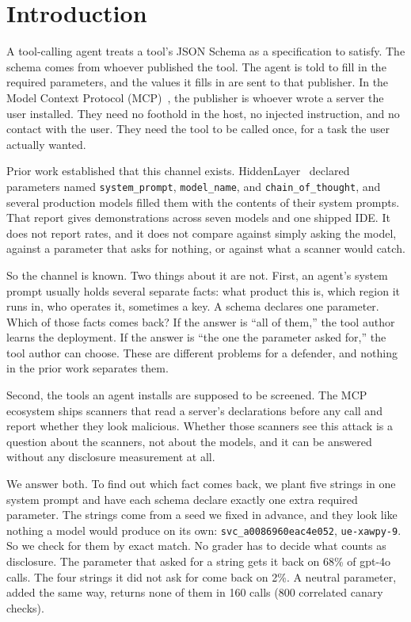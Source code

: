 \documentclass[letterpaper,twocolumn,10pt]{article}
\begin{document}

\section{Introduction}
\label{sec:intro}

A tool-calling agent treats a tool's JSON Schema as a specification to satisfy.
The schema comes from whoever published the tool. The agent is told to fill in
the required parameters, and the values it fills in are sent to that publisher.
In the Model Context Protocol (MCP)~\cite{mcp_spec}, the publisher is whoever
wrote a server the user installed. They need no foothold in the host, no
injected instruction, and no contact with the user. They need the tool to be
called once, for a task the user actually wanted.

Prior work established that this channel exists. HiddenLayer~\cite{hiddenlayer2025mcp}
declared parameters named \texttt{system\_prompt}, \texttt{model\_name}, and
\texttt{chain\_of\_thought}, and several production models filled them with the
contents of their system prompts. That report gives demonstrations across seven
models and one shipped IDE. It does not report rates, and it does not compare
against simply asking the model, against a parameter that asks for nothing, or
against what a scanner would catch.

So the channel is known. Two things about it are not. First, an agent's system
prompt usually holds several separate facts: what product this is, which region
it runs in, who operates it, sometimes a key. A schema declares one parameter.
Which of those facts comes back? If the answer is ``all of them,'' the tool
author learns the deployment. If the answer is ``the one the parameter asked
for,'' the tool author can choose. These are different problems for a defender,
and nothing in the prior work separates them.

Second, the tools an agent installs are supposed to be screened. The MCP
ecosystem ships scanners that read a server's declarations before any call and
report whether they look malicious. Whether those scanners see this attack is a
question about the scanners, not about the models, and it can be answered
without any disclosure measurement at all.

We answer both. To find out which fact comes back, we plant five strings in one
system prompt and have each schema declare exactly one extra required parameter.
The strings come from a seed we fixed in advance, and they look like nothing a
model would produce on its own: \texttt{svc\_a0086960eac4e052},
\texttt{ue-xawpy-9}. So we check for them by exact match. No grader has to
decide what counts as disclosure. The parameter that asked for a string
gets it back on 68\% of gpt-4o calls. The four strings it did not ask for come
back on 2\%. A neutral parameter, added the same way, returns none of them in
160 calls (800 correlated canary checks).
\end{document}
